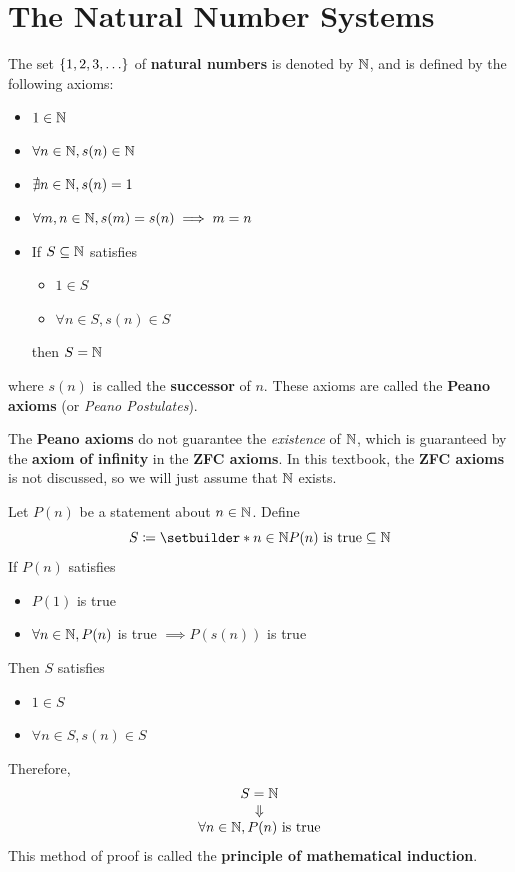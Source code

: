 \section{The Natural Number Systems}

The set $\set*{1, 2, 3, \dots}$ of \textbf{natural numbers} is denoted by $\mathbb{N}$, and is defined by the following axioms:
\begin{itemize}
    \item $1 \in \mathbb{N}$
    \item $\forall n \in \mathbb{N}, s(n) \in \mathbb{N}$
    \item $\nexists n \in \mathbb{N}, s(n) = 1$
    \item $\forall m, n \in \mathbb{N}, s(m) = s(n) \implies m = n$
    \item If $S \subseteq \mathbb{N}$ satisfies
    \begin{itemize}
        \item $1 \in S$
        \item $\forall n \in S, s(n) \in S$
    \end{itemize}
    then $S = \mathbb{N}$
\end{itemize}
where $s(n)$ is called the \textbf{successor} of $n$.
These axioms are called the \textbf{Peano axioms} (or \emph{Peano Postulates}).

\bigskip

\begin{remark}
    The \textbf{Peano axioms} do not guarantee the \emph{existence} of $\mathbb{N}$, which is guaranteed by the
    \textbf{axiom of infinity} in the \textbf{ZFC axioms}. In this textbook, the \textbf{ZFC axioms}
    is not discussed, so we will just assume that $\mathbb{N}$ exists.
\end{remark}

\bigskip

\begin{definition} \label{an:def:mathematical-induction}
    Let $P(n)$ be a statement about $n \in \mathbb{N}$. Define
    \[
    S \coloneqq \setbuilder*{n \in \N}{P(n) \text{ is true}} \subseteq \N
    \]
    If $P(n)$ satisfies
    \begin{itemize}
        \item $P(1)$ is true
        \item $\forall n \in \mathbb{N}, P(n)$ is true $\implies P(s(n))$ is true
    \end{itemize}
    Then $S$ satisfies
    \begin{itemize}
        \item $1 \in S$
        \item $\forall n \in S, s(n) \in S$
    \end{itemize}
    Therefore,
    \[
    \begin{array}{c}
        S = \mathbb{N} \\
        \Downarrow \\
        \forall n \in \mathbb{N}, P(n) \text{ is true}
    \end{array}
    \]
    This method of proof is called the \textbf{principle of mathematical induction}.
\end{definition}

